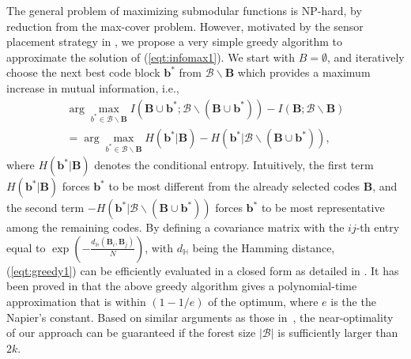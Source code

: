 \documentclass[runningheads]{llncs}
\begin{document}
The general problem of maximizing submodular functions is NP-hard, by reduction
from the max-cover problem.  However, motivated by the sensor placement strategy in \cite{Guestrin08},
we propose a very simple greedy algorithm to approximate the
solution of (\ref{eqt:infomax1}). We start with $B=\emptyset$, and iteratively
choose the next best code block $\mathbf{b}^*$ from $\mathcal{B} \backslash
\mathbf{B}$ which provides a maximum increase in mutual information, i.e.,
\begin{eqnarray} \nonumber
\arg \max_{b^* \in \mathcal{B} \backslash \mathbf{B}}  I(\mathbf{B} \cup \mathbf{b}^*; \mathcal{B}  \backslash (\mathbf{B} \cup \mathbf{b}^*)) - I(\mathbf{B}; \mathcal{B} \backslash \mathbf{B}) \\
 = \arg \max_{b^* \in \mathcal{B} \backslash \mathbf{B}} H(\mathbf{b}^* | \mathbf{B}) - H(\mathbf{b}^* | \mathcal{B}  \backslash (\mathbf{B} \cup \mathbf{b}^*)),
 \label{eqt:greedy1}
\end{eqnarray}
 where $H(\mathbf{b}^* | \mathbf{B})$ denotes the conditional entropy.
 Intuitively, the first term $H(\mathbf{b}^* | \mathbf{B})$ forces
 $\mathbf{b}^*$ to be most different from the already selected codes
 $\mathbf{B}$, and the second term $- H(\mathbf{b}^* | \mathcal{B} \backslash
 (\mathbf{B} \cup \mathbf{b}^*))$ forces $\mathbf{b}^*$ to be most
 representative among the remaining codes. By defining a covariance matrix with
 the $ij$-th entry equal to $\exp(-\frac{d_{\mathbb{H}}(\mathbf{B}_i,
   \mathbf{B}_j)}{N})$, with $d_{\mathbb{H}}$ being the Hamming distance,
 (\ref{eqt:greedy1}) can be efficiently evaluated in a closed form as detailed
 in \cite{Guestrin08}.
 It has been proved in \cite{Guestrin08, submodular-bound}
  that the above greedy algorithm gives a polynomial-time
 approximation that is within $(1-1/e)$ of the optimum, where $e$ is the the
 Napier's constant.  Based on similar arguments as those in~\cite{Guestrin08},
 the near-optimality of our approach can be guaranteed if the forest size
 $|\mathcal{B}|$ is sufficiently larger than $2k$.
\end{document}

